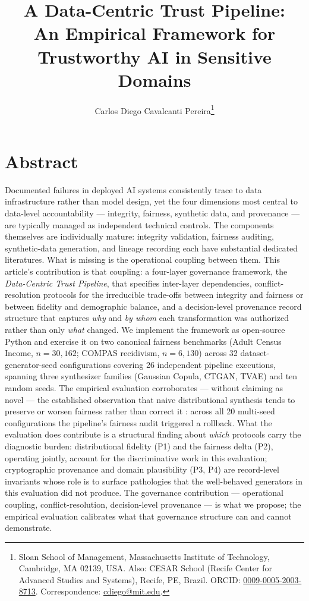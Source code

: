 \documentclass[11pt]{article}
\title{\textbf{A Data-Centric Trust Pipeline:\\An Empirical Framework for Trustworthy AI in Sensitive Domains}}
\author{
  Carlos Diego Cavalcanti Pereira\thanks{Sloan School of Management, Massachusetts Institute of Technology, Cambridge, MA 02139, USA. Also: CESAR School (Recife Center for Advanced Studies and Systems), Recife, PE, Brazil. ORCID: \href{https://orcid.org/0009-0005-2003-8713}{0009-0005-2003-8713}. Correspondence: \href{mailto:cdiego@mit.edu}{cdiego@mit.edu}.}
}
\date{}
\begin{document}
\maketitle

\section*{Abstract}

Documented failures in deployed AI systems consistently trace to data infrastructure rather than model design, yet the four dimensions most central to data-level accountability --- integrity, fairness, synthetic data, and provenance --- are typically managed as independent technical controls. The components themselves are individually mature: integrity validation, fairness auditing, synthetic-data generation, and lineage recording each have substantial dedicated literatures. What is missing is the operational coupling between them. This article's contribution is that coupling: a four-layer governance framework, the \emph{Data-Centric Trust Pipeline}, that specifies inter-layer dependencies, conflict-resolution protocols for the irreducible trade-offs between integrity and fairness or between fidelity and demographic balance, and a decision-level provenance record structure that captures \emph{why} and \emph{by whom} each transformation was authorized rather than only \emph{what} changed. We implement the framework as open-source Python and exercise it on two canonical fairness benchmarks (Adult Census Income, $n = 30{,}162$; COMPAS recidivism, $n = 6{,}130$) across 32 dataset-generator-seed configurations covering 26 independent pipeline executions, spanning three synthesizer families (Gaussian Copula, CTGAN, TVAE) and ten random seeds. The empirical evaluation corroborates --- without claiming as novel --- the established observation that naive distributional synthesis tends to preserve or worsen fairness rather than correct it \cite{Capasso2025,Kapania2025}: across all 20 multi-seed configurations the pipeline's fairness audit triggered a rollback. What the evaluation does contribute is a structural finding about \emph{which} protocols carry the diagnostic burden: distributional fidelity (P1) and the fairness delta (P2), operating jointly, account for the discriminative work in this evaluation; cryptographic provenance and domain plausibility (P3, P4) are record-level invariants whose role is to surface pathologies that the well-behaved generators in this evaluation did not produce. The governance contribution --- operational coupling, conflict-resolution, decision-level provenance --- is what we propose; the empirical evaluation calibrates what that governance structure can and cannot demonstrate.
\end{document}
